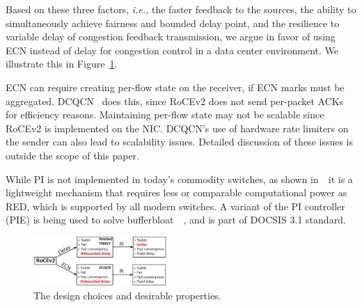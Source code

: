Based on these three factors, {\em i.e.,} the faster feedback to the sources, 
the ability to simultaneously achieve fairness and bounded delay point, and the resilience 
to variable delay of congestion feedback transmission, we argue
in favor of using ECN instead of delay for congestion control in a data center
environment. We illustrate this in Figure~\ref{fig:design_choice}.

ECN can require creating per-flow state on the receiver, if ECN marks must be
aggregated. DCQCN~\cite{dcqcn} does this, since RoCEv2 does not send per-packet
ACKs for efficiency reasons. Maintaining per-flow state may not be scalable since
RoCEv2 is implemented on the NIC.  DCQCN's use of hardware rate limiters on the
sender can also lead to scalability issues.  Detailed discussion of these issues
is outside the scope of this paper.

While PI is not implemented in today's commodity switches, as shown
in~\cite{hollot2001designing}~it is a lightweight mechanism that requires less
or comparable computational power as RED, which is supported by all modern
switches. A variant of the PI controller (PIE) is being used to solve
bufferbloat~\cite{conf/hpsr/PanNPPSBV13,bufferbloat-pi}~, and is part of DOCSIS 3.1
standard.

\begin{figure}[t]
 \center
\includegraphics[width=0.45\textwidth]{figures/design_choice.eps}
\vspace{-0.5em}
 \caption{The design choices and desirable properties.}
\vspace{-1.5em}
\label{fig:design_choice}
\end{figure}


